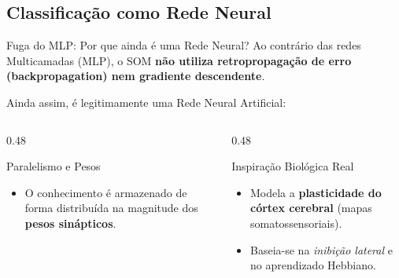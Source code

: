 \documentclass[aspectratio=169]{beamer}
\begin{document}
	\subsection{Classificação como Rede Neural}
	\begin{frame}{Fuga do MLP: Por que ainda é uma Rede Neural?}
		Ao contrário das redes Multicamadas (MLP), o SOM \textbf{não utiliza retropropagação de erro (backpropagation) nem gradiente descendente}.
		
		Ainda assim, é legitimamente uma Rede Neural Artificial:
		
		\begin{columns}[T]
			\begin{column}{0.48\textwidth}
				\begin{block}{Paralelismo e Pesos}
					\begin{itemize}
						\item O conhecimento é armazenado de forma distribuída na magnitude dos \textbf{pesos sinápticos}.
					\end{itemize}
				\end{block}
			\end{column}
			
			\begin{column}{0.48\textwidth}
				\begin{block}{Inspiração Biológica Real}
					\begin{itemize}
						\item Modela a \textbf{plasticidade do córtex cerebral} (mapas somatossensoriais).
						\item Baseia-se na \textit{inibição lateral} e no aprendizado Hebbiano.
					\end{itemize}
				\end{block}
			\end{column}
		\end{columns}
	\end{frame}
	
\end{document}
